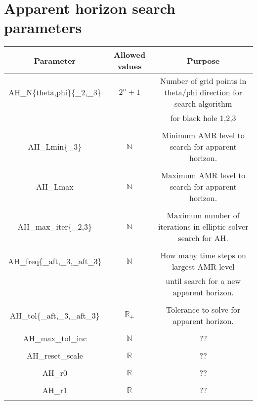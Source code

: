 \documentclass{article}
\begin{document}
\newpage
\section*{Apparent horizon search parameters}

\begin{table}[h]
   \centering 
   \begin{tabular}{ccc}
      Parameter  & Allowed values & Purpose \\
      \midrule\midrule
      AH\_N\{theta,phi\}\{\_2,\_3\} 
      &
      $2^n+1$
      &
      Number of grid points in theta/phi direction for search algorithm
      \\
      & & for black hole 1,2,3
      \\ \\
      AH\_Lmin\{\_3\} 
      &
      $\mathbb{N}$
      &
      Minimum AMR level to search for apparent horizon.
      \\ \\
      AH\_Lmax 
      &
      $\mathbb{N}$
      &
      Maximum AMR level to search for apparent horizon.
      \\ \\
      AH\_max\_iter\{\_2,3\} 
      &
      $\mathbb{N}$
      &
      Maximum number of iterations in elliptic solver search for AH.
      \\ \\
      AH\_freq\{\_aft,\_3,\_aft\_3\}
      &
      $\mathbb{N}$
      &
      How many time steps on largest AMR level 
      \\
      & & 
      until search for a new apparent horizon.
      \\ \\
      AH\_tol\{\_aft,\_3,\_aft\_3\}
      &
      $\mathbb{R}_+$
      &
      Tolerance to solve for apparent horizon.
      \\ \\
      AH\_max\_tol\_inc 
      &
      $\mathbb{N}$
      &
      ??
      \\ \\
      AH\_reset\_scale 
      &
      $\mathbb{R}$
      &
      ??
      \\ \\
      AH\_r0 
      &
      $\mathbb{R}$
      &
      ??
      \\ \\
      AH\_r1 
      &
      $\mathbb{R}$
      &
      ??
      \\ \\

\end{tabular}
\end{table}
\end{document}

